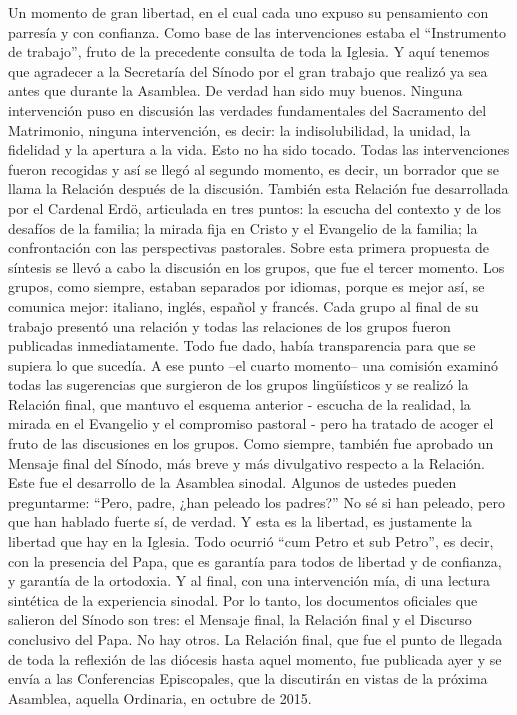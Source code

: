 \documentclass[letterpaper]{report}
\begin{document}
Un momento de gran libertad, en el cual cada uno expuso su pensamiento con parresía y con confianza. Como base de las intervenciones estaba el “Instrumento de trabajo”, fruto de la precedente consulta de toda la Iglesia. Y aquí tenemos que agradecer a la Secretaría del Sínodo por el gran trabajo que realizó ya sea antes que durante la Asamblea. De verdad han sido muy buenos.
Ninguna intervención puso en discusión las verdades fundamentales del Sacramento del Matrimonio, ninguna intervención, es decir: la indisolubilidad, la unidad, la fidelidad y la apertura a la vida. Esto no ha sido tocado.
Todas las intervenciones fueron recogidas y así se llegó al segundo momento, es decir, un borrador que se llama la Relación después de la discusión. También esta Relación fue desarrollada por el Cardenal Erdö, articulada en tres puntos: la escucha del contexto y de los desafíos de la familia; la mirada fija en Cristo y el Evangelio de la familia; la confrontación con las perspectivas pastorales.
Sobre esta primera propuesta de síntesis se llevó a cabo la discusión en los grupos, que fue el tercer momento. Los grupos, como siempre, estaban separados por idiomas, porque es mejor así, se comunica mejor: italiano, inglés, español y francés. Cada grupo al final de su trabajo presentó una relación y todas las relaciones de los grupos fueron publicadas inmediatamente. Todo fue dado, había transparencia para que se supiera lo que sucedía.
A ese punto –el cuarto momento– una comisión examinó todas las sugerencias que surgieron de los grupos lingüísticos y se realizó la Relación final, que mantuvo el esquema anterior - escucha de la realidad, la mirada en el Evangelio y el compromiso pastoral - pero ha tratado de acoger el fruto de las discusiones en los grupos. Como siempre, también fue aprobado un Mensaje final del Sínodo, más breve y más divulgativo respecto a la Relación.
Este fue el desarrollo de la Asamblea sinodal. Algunos de ustedes pueden preguntarme: “Pero, padre, ¿han peleado los padres?” No sé si han peleado, pero que han hablado fuerte sí, de verdad. Y esta es la libertad, es justamente la libertad que hay en la Iglesia. Todo ocurrió “cum Petro et sub Petro”, es decir, con la presencia del Papa, que es garantía para todos de libertad y de confianza, y garantía de la ortodoxia. Y al final, con una intervención mía, di una lectura sintética de la experiencia sinodal.
Por lo tanto, los documentos oficiales que salieron del Sínodo son tres: el Mensaje final, la Relación final y el Discurso conclusivo del Papa. No hay otros.
La Relación final, que fue el punto de llegada de toda la reflexión de las diócesis hasta aquel momento, fue publicada ayer y se envía a las Conferencias Episcopales, que la discutirán en vistas de la próxima Asamblea, aquella Ordinaria, en octubre de 2015.
\end{document}
